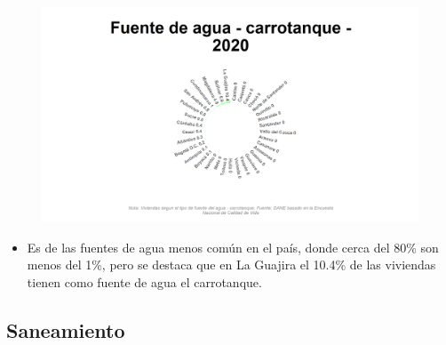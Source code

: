     \begin{figure}[H]
        \caption[Carrotanque como fuentes de agua por departamentos para 2020 ]{\label{carrotanque_dptos} }
        \begin{center}
        \includegraphics[width=\textwidth,keepaspectratio]{img/var_147_static.png}
        \end{center}
    \end{figure}
            \begin{itemize}
                    \item Es de las fuentes de agua menos común en el país, donde cerca del 80\% son menos del 1\%, pero se destaca que en La Guajira el 10.4\% de las viviendas tienen como fuente de agua el carrotanque.
                    \end{itemize}

    \subsection{Saneamiento}

